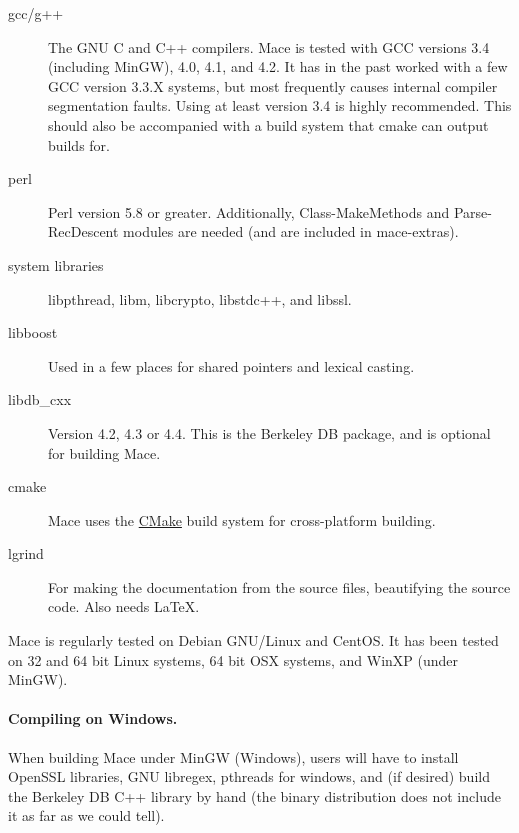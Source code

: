 \begin{description}

\item[gcc/g++] The GNU C and C++ compilers.  Mace is tested with GCC
  versions 3.4 (including MinGW), 4.0, 4.1, and 4.2.  It has in the past
  worked with a few GCC version 3.3.X systems, but most frequently
  causes internal compiler segmentation faults.  Using at least version
  3.4 is highly recommended.  This should also be accompanied with a
  build system that cmake can output builds for.

\item[perl] Perl version 5.8 or greater.  Additionally,
Class-MakeMethods and Parse-RecDescent modules are needed (and are
included in mace-extras).

\item[system libraries] libpthread, libm, libcrypto, libstdc++, and libssl.

\item[libboost] Used in a few places for shared pointers and lexical casting.

\item[libdb\_cxx] Version 4.2, 4.3 or 4.4.  This is the Berkeley DB
  package, and is optional for building Mace.

\item[cmake] Mace uses the \href{http://www.cmake.org}{CMake} build
  system for cross-platform building.  

\item[lgrind] For making the documentation from the source files, beautifying 
  the source code.  Also needs LaTeX.

\end{description}

Mace is regularly tested on Debian GNU/Linux and CentOS.  It has been
tested on 32 and 64 bit Linux systems, 64 bit OSX systems, and WinXP
(under MinGW). 

\paragraph{Compiling on Windows.}
When building Mace under MinGW (Windows), users will have to install
OpenSSL libraries, GNU libregex, pthreads for windows, and (if desired)
build the Berkeley DB C++ library by hand (the binary distribution does
not include it as far as we could tell).



